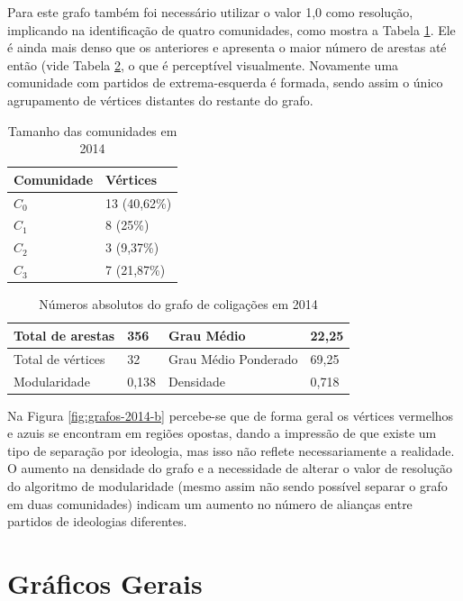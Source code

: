 Para este grafo também foi necessário utilizar o valor 1,0 como resolução, implicando na identificação de quatro comunidades, como mostra a Tabela \ref{table-2014a}. Ele é ainda mais denso que os anteriores e apresenta o maior número de arestas até então (vide Tabela \ref{table-2014b}, o que é perceptível visualmente. Novamente uma comunidade com partidos de extrema-esquerda é formada, sendo assim o único agrupamento de vértices distantes do restante do grafo. 
\begin{table}[h]
\centering
\begin{tabular}{|l|l|}
\hline
Comunidade & Vértices \\ \hline
$C_0$         &     13 (40,62\%)                \\ \hline
$C_1$         &     8 (25\%)                \\ \hline
$C_2$         &       3 (9,37\%)               \\ \hline
$C_3$         &       7 (21,87\%)               \\ \hline
\end{tabular}
\caption{Tamanho das comunidades em 2014}
\label{table-2014a}
\end{table}


\begin{table}[h]
\centering
\begin{tabular}{|l|l|l|l|}
\hline
Total de arestas  & 356 & Grau Médio           & 22,25 \\ \hline
Total de vértices & 32 & Grau Médio Ponderado & 69,25 \\ \hline
Modularidade      & 0,138 & Densidade            & 0,718 \\ \hline
\end{tabular}
\caption{Números absolutos do grafo de coligações em 2014}
\label{table-2014b}
\end{table}

Na Figura \ref{fig:grafos-2014-b} percebe-se que de forma geral os vértices vermelhos e azuis se encontram em regiões opostas, dando a impressão de que existe um tipo de separação por ideologia, mas isso não reflete necessariamente a realidade. O aumento na densidade do grafo e a necessidade de alterar o valor de resolução do algoritmo  de modularidade (mesmo assim não sendo possível separar o grafo em duas comunidades) indicam um aumento no número de alianças entre partidos de ideologias diferentes. 

\section{Gráficos Gerais}
\label{resultados__graficos-gerais}

